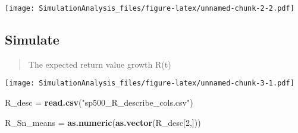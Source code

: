 \documentclass[
]{article}
\newenvironment{Shaded}{\begin{snugshade}}{\end{snugshade}}
\newcommand{\CommentTok}[1]{\textcolor[rgb]{0.56,0.35,0.01}{\textit{#1}}}
\newcommand{\DataTypeTok}[1]{\textcolor[rgb]{0.13,0.29,0.53}{#1}}
\newcommand{\DecValTok}[1]{\textcolor[rgb]{0.00,0.00,0.81}{#1}}
\newcommand{\KeywordTok}[1]{\textcolor[rgb]{0.13,0.29,0.53}{\textbf{#1}}}
\newcommand{\NormalTok}[1]{#1}
\newcommand{\OperatorTok}[1]{\textcolor[rgb]{0.81,0.36,0.00}{\textbf{#1}}}
\newcommand{\StringTok}[1]{\textcolor[rgb]{0.31,0.60,0.02}{#1}}
\begin{document}
\texttt{[image: SimulationAnalysis\_files/figure-latex/unnamed-chunk-2-2.pdf]}

\hypertarget{simulate}{%
\subsection{Simulate}\label{simulate}}

\begin{quote}
The expected return value growth R(t)
\end{quote}

\begin{Shaded}
\end{Shaded}

\texttt{[image: SimulationAnalysis\_files/figure-latex/unnamed-chunk-3-1.pdf]}

\begin{Shaded}
\begin{Highlighting}[]
\NormalTok{R_desc =}\StringTok{ }\KeywordTok{read.csv}\NormalTok{(}\StringTok{"sp500_R_describe_cols.csv"}\NormalTok{)}

\NormalTok{R_Sn_means =}\StringTok{ }\KeywordTok{as.numeric}\NormalTok{(}\KeywordTok{as.vector}\NormalTok{(R_desc[}\DecValTok{2}\NormalTok{,]))}
\end{Highlighting}
\end{Shaded}
\end{document}
